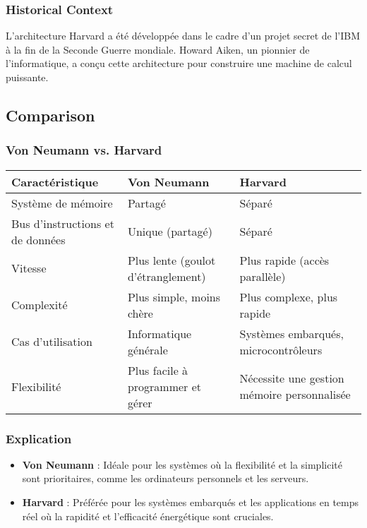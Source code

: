 \documentclass[10pt,a4paper]{article}
\begin{document}
\subsubsection*{Historical Context}
L'architecture Harvard a été développée dans le cadre d'un projet secret de l'IBM à la fin de la Seconde Guerre mondiale. Howard Aiken, un pionnier de l'informatique, a conçu cette architecture pour construire une machine de calcul puissante.

\subsection*{Comparison}

\subsubsection*{Von Neumann vs. Harvard}

\begin{center}
\begin{tabular}{|l|l|l|}
\hline
\textbf{Caractéristique} & \textbf{Von Neumann} & \textbf{Harvard} \\
\hline
Système de mémoire & Partagé & Séparé \\
\hline
Bus d'instructions et de données & Unique (partagé) & Séparé \\
\hline
Vitesse & Plus lente (goulot d'étranglement) & Plus rapide (accès parallèle) \\
\hline
Complexité & Plus simple, moins chère & Plus complexe, plus rapide \\
\hline
Cas d'utilisation & Informatique générale & Systèmes embarqués, microcontrôleurs \\
\hline
Flexibilité & Plus facile à programmer et gérer & Nécessite une gestion mémoire personnalisée \\
\hline
\end{tabular}
\end{center}

\subsubsection*{Explication}
\begin{itemize}
    \item \textbf{Von Neumann} : Idéale pour les systèmes où la flexibilité et la simplicité sont prioritaires, comme les ordinateurs personnels et les serveurs.
    \item \textbf{Harvard} : Préférée pour les systèmes embarqués et les applications en temps réel où la rapidité et l'efficacité énergétique sont cruciales.
\end{itemize}
\end{document}
